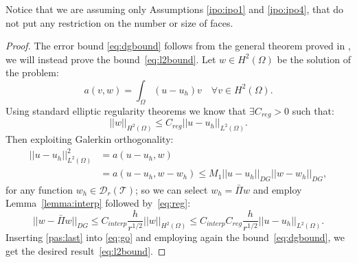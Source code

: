 \documentclass[12pt, a4paper]{article}
\theoremstyle{definition}
\theoremstyle{plain}
\theoremstyle{plain}
\newtheorem{teor}{Theorem}
\theoremstyle{definition}
\begin{document}
Notice that we are assuming only Assumptions \ref{ipo:ipo1} and \ref{ipo:ipo4}, 
that do not put any restriction on the number or size of faces.
\begin{proof}
	The error bound \eqref{eq:dgbound} follows from the general theorem proved 
	in \cite{hpmet}, we will instead prove the bound~\eqref{eq:l2bound}. Let $w 
	\in H^2(\Omega)$ be the solution of the problem:
	\begin{equation*}
		a(v, w) = \int_{\Omega} (u-u_h)v \quad \forall v \in  H^2(\Omega).
	\end{equation*}
	Using standard elliptic regularity theorems we know that $\exists C_{reg}>0$ such that:
	\begin{equation} \label{eq:reg}
		|\!| w |\!|_{H^2(\Omega)} \leq C_{reg} |\!| u - u_h |\!|_{L^2(\Omega)}.
	\end{equation}
	Then exploiting Galerkin orthogonality:
	\begin{equation} \label{eq:go}
	\begin{split}
		|\!| u - u_h |\!|^2_{L^2(\Omega)} &= a(u-u_h, w)\\
		&= a(u-u_h, w-w_h) \leq M_1 |\!| u - u_h |\!|_{DG} |\!| w - w_h |\!|_{DG},
	\end{split}
	\end{equation}
	for any function $w_h \in \mathcal{D}_r(\mathcal{T})$; so we can select 
	$w_h = \bar{\Pi}w$ and employ Lemma~\ref{lemma:interp} followed 
	by~\eqref{eq:reg}:
	\begin{equation} \label{pas:last}
		|\!|w-\bar{\Pi}w|\!|_{DG} \leq C_{interp} \frac{h}{r^{1/2}} |\!| w |\!|_{H^2(\Omega)} \leq C_{interp}C_{reg} \frac{h}{r^{1/2}} |\!| u-u_h |\!|_{L^2(\Omega)}.
	\end{equation}
	Inserting \eqref{pas:last} into \eqref{eq:go} and employing again the 
	bound~\eqref{eq:dgbound}, we get the desired result~\eqref{eq:l2bound}.
\end{proof}	
\end{document}
